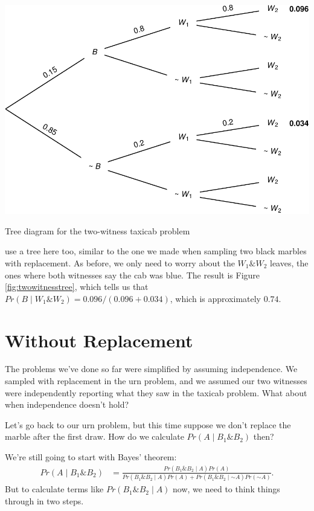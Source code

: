 \documentclass[justified]{tufte-book}
\newcommand{\given}{\mid}
\renewcommand{\neg}{\mathbin{\sim}}
\renewcommand{\wedge}{\mathbin{\&}}
\newcommand{\p}{Pr}
\theoremstyle{definition}
\theoremstyle{definition}
\theoremstyle{definition}
\theoremstyle{definition}
\theoremstyle{remark}
\begin{document}
\begin{marginfigure}
\includegraphics{_main_files/figure-latex/twowitnesstree-1} \caption[Tree diagram for the two-witness taxicab problem]{Tree diagram for the two-witness taxicab problem}\label{fig:twowitnesstree}
\end{marginfigure}

 use a tree here too, similar to the one we made when sampling two black marbles with replacement. As before, we only need to worry about the \(W_1 \wedge W_2\) leaves, the ones where both witnesses say the cab was blue. The result is Figure \ref{fig:twowitnesstree}, which tells us that \(\p(B \given W_1 \wedge W_2) = 0.096 / (0.096 + 0.034)\), which is approximately \(0.74\).

\hypertarget{without-replacement}{%
\section{Without Replacement}\label{without-replacement}}

The problems we've done so far were simplified by assuming independence. We sampled with replacement in the urn problem, and we assumed our two witnesses were independently reporting what they saw in the taxicab problem. What about when independence doesn't hold?

Let's go back to our urn problem, but this time suppose we don't replace the marble after the first draw. How do we calculate \(\p(A \given B_1 \wedge B_2)\) then?

We're still going to start with Bayes' theorem:
\[
  \begin{aligned}
    \p(A \given B_1 \wedge B_2) &= \frac{\p(B_1 \wedge B_2 \given A)\p(A)}{\p(B_1 \wedge B_2 \given A) \p(A) + \p(B_1 \wedge B_2 \given \neg A) \p(\neg A)}.
  \end{aligned}
\]
But to calculate terms like \(\p(B_1 \wedge B_2 \given A)\) now, we need to think things through in two steps.
\end{document}
